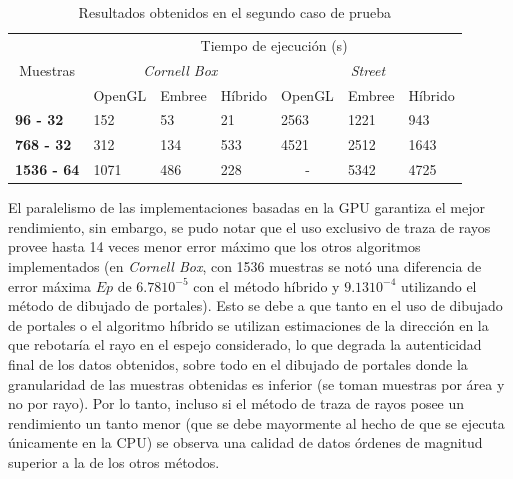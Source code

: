 \begin{table}[H]
	\centering
	\label{tab:caso2}
	\caption{Resultados obtenidos en el segundo caso de prueba}
	\begin{tabular}{|l|l|l|l|l|l|l|}
		\hline
		\multicolumn{1}{|c|}{\multirow{3}{*}{Muestras}} & \multicolumn{6}{c|}{Tiempo de ejecución (s)}                                                                                         \\ \cline{2-7} 
		\multicolumn{1}{|c|}{}                          & \multicolumn{3}{c|}{\textit{Cornell Box}}                                                & \multicolumn{3}{c|}{\textit{Street}}      \\ \cline{2-7} 
		\multicolumn{1}{|c|}{}                          & \multicolumn{1}{c|}{OpenGL} & \multicolumn{1}{c|}{Embree} & \multicolumn{1}{c|}{Híbrido} & OpenGL                 & Embree & Híbrido \\ \hline
		\textbf{96 - 32}                                & 152                         & 53                          & 21                           & 2563                   & 1221   & 943     \\ \hline
		\textbf{768 - 32}                               & 312                         & 134                         & 533                          & 4521                   & 2512   & 1643    \\ \hline
		\textbf{1536 - 64}                              & 1071                        & 486                         & 228                          & \multicolumn{1}{c|}{-} & 5342   & 4725    \\ \hline
	\end{tabular}
\end{table}

El paralelismo de las implementaciones basadas en la GPU garantiza el mejor rendimiento, sin embargo, se pudo notar que el uso exclusivo de traza de rayos provee hasta 14 veces menor error máximo que los otros algoritmos implementados (en \textit{Cornell Box}, con 1536 muestras se notó una diferencia de error máxima $Ep$ de $6.78 10^{-5}$ con el método híbrido y  $9.13 10^{-4}$ utilizando el método de dibujado de portales). Esto se debe a que tanto en el uso de dibujado de portales o el algoritmo híbrido se utilizan estimaciones de la dirección en la que rebotaría el rayo en el espejo considerado, lo que degrada la autenticidad final de los datos obtenidos, sobre todo en el dibujado de portales donde la granularidad de las muestras obtenidas es inferior (se toman muestras por área y no por rayo). Por lo tanto, incluso si el método de traza de rayos posee un rendimiento un tanto menor (que se debe mayormente al hecho de que se ejecuta únicamente en la CPU) se observa una calidad de datos órdenes de magnitud superior a la de los otros métodos.

